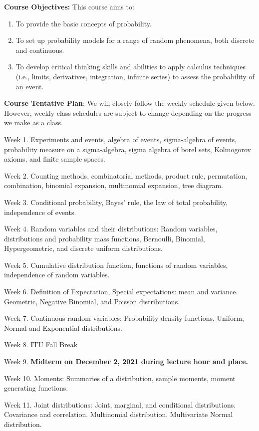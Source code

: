 \documentclass[
  12pt,
]{article}
\providecommand{\tightlist}{%
  \setlength{\itemsep}{0pt}\setlength{\parskip}{0pt}}
\begin{document}
\textbf{Course Objectives:} This course aims to:

\begin{enumerate}
\def\labelenumi{\arabic{enumi}.}
\tightlist
\item
  To provide the basic concepts of probability.
\item
  To set up probability models for a range of random phenomena, both
  discrete and continuous.
\item
  To develop critical thinking skills and abilities to apply calculus
  techniques (i.e., limits, derivatives, integration, infinite series)
  to assess the probability of an event.
\end{enumerate}

\textbf{Course Tentative Plan}: We will closely follow the weekly
schedule given below. However, weekly class schedules are subject to
change depending on the progress we make as a class.

Week 1. Experiments and events, algebra of events, sigma-algebra of
events, probability measure on a sigma-algebra, sigma algebra of borel
sets, Kolmogorov axioms, and finite sample spaces.

Week 2. Counting methods, combinatorial methods, product rule,
permutation, combination, binomial expansion, multinomial expansion,
tree diagram.

Week 3. Conditional probability, Bayes' rule, the law of total
probability, independence of events.

Week 4. Random variables and their distributions: Random variables,
distributions and probability mass functions, Bernoulli, Binomial,
Hypergeometric, and discrete uniform distributions.

Week 5. Cumulative distribution function, functions of random variables,
independence of random variables.

Week 6. Definition of Expectation, Special expectations: mean and
variance. Geometric, Negative Binomial, and Poisson distributions.

Week 7. Continuous random variables: Probability density functions,
Uniform, Normal and Exponential distributions.

Week 8. ITU Fall Break

Week 9. \textbf{Midterm on December 2, 2021 during lecture hour and
place.}

Week 10. Moments: Summaries of a distribution, sample moments, moment
generating functions.

Week 11. Joint distributions: Joint, marginal, and conditional
distributions. Covariance and correlation. Multinomial distribution.
Multivariate Normal distribution.
\end{document}
